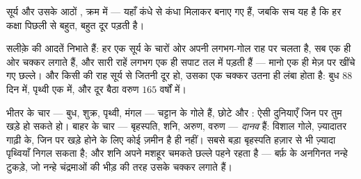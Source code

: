 \begin{omfigure}

{\small सूर्य और उसके आठों , क्रम में --- यहाँ कंधे से कंधा
मिलाकर बनाए गए हैं, जबकि सच यह है कि हर कक्षा पिछली से बहुत, बहुत
दूर पड़ती है।}
\end{omfigure}

\begin{proposition}[ग्रहों की आदतें]\label{prop:g4:solar-system:habits}
 सलीक़े की आदतें निभाते हैं: हर एक सूर्य के चारों ओर अपनी
लगभग-गोल राह पर चलता है, सब एक ही ओर चक्कर लगाते हैं, और सारी राहें
लगभग एक ही सपाट तल में पड़ती हैं --- मानो एक ही मेज़ पर खींचे गए
छल्ले। और किसी  की राह सूर्य से जितनी दूर हो, उसका एक चक्कर उतना
ही लंबा होता है: बुध $88$ दिन में, पृथ्वी एक  में, और दूर बैठा
वरुण $165$ वर्षों में।
\end{proposition}

\begin{example}[चट्टानी ग्रह और गैस के दानव]\label{ex:g4:solar-system:kinds}
भीतर के चार  --- बुध, शुक्र, पृथ्वी, मंगल --- चट्टान के गोले
हैं, छोटे और : ऐसी दुनियाएँ जिन पर तुम खड़े हो सकते हो। बाहर के
चार --- बृहस्पति, शनि, अरुण, वरुण --- \emph{दानव} हैं: विशाल गोले,
ज़्यादातर गाढ़ी  के, जिन पर खड़े होने के लिए कोई ज़मीन है ही नहीं।
सबसे बड़ा बृहस्पति हज़ार से भी ज़्यादा पृथ्वियाँ निगल सकता है; और शनि
अपने मशहूर चमकते छल्ले पहने रहता है --- बर्फ़ के अनगिनत नन्हे टुकड़े,
जो नन्हे चंद्रमाओं की भीड़ की तरह उसके चक्कर लगाते हैं।
\end{example}

